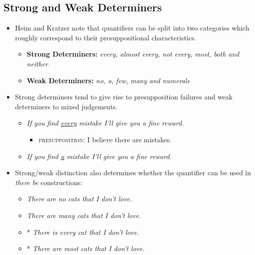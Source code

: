 \documentclass[a4paper]{article}
\begin{document}
\subsection{Strong and Weak Determiners}
\begin{itemize}
  \item Heim and Kratzer note that quantifiers can be split into two categories which roughly correspond to their presuppositional characteristics.
  \begin{itemize}
    \item \textbf{Strong Determiners:} \emph{every, almost every, not every, most, both and neither}
    \item \textbf{Weak Determiners:} \emph{no, a, few, many and numerals}
  \end{itemize}

  \item Strong determiners tend to give rise to presupposition failures and weak determiners to mixed judgements.
  \begin{itemize}
  	\item \emph{If you find \underline{every} mistake I'll give you a fine reward.}
    \begin{itemize}
      \item \textsc{presupposition:} I believe there are mistakes.
    \end{itemize}
    \item \emph{If you find \underline{a} mistake I'll give you a fine reward.}
  \end{itemize}
  
  \item Strong/weak distinction also determines whether the quantifier can be used in \emph{there be} constructions:
  \begin{itemize}
    \item \emph{There are no cats that I don't love.}
    \item \emph{There are many cats that I don't love.}
    \item * \emph{There is every cat that I don't love.}
    \item * \emph{There are most cats that I don't love.}
  \end{itemize}


\end{itemize}
\end{document}

